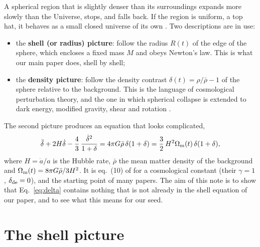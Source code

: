 \documentclass[11pt,a4paper]{article}
\begin{document}
A spherical region that is slightly denser than its surroundings expands
more slowly than the Universe, stops, and falls back. If the region is
uniform, a top hat, it behaves as a small closed universe of its own
\citep{Gunn1972,Peebles1980}. Two descriptions are in use:
\begin{itemize}
\item the \textbf{shell (or radius) picture}: follow the radius $R(t)$ of
the edge of the sphere, which encloses a fixed mass $M$ and obeys
Newton's law. This is what our main paper does, shell by shell;
\item the \textbf{density picture}: follow the density contrast
$\delta(t)=\rho/\bar\rho-1$ of the sphere relative to the background. This
is the language of cosmological perturbation theory, and the one in
which spherical collapse is extended to dark energy, modified gravity,
shear and rotation
\citep[e.g.][]{Fosalba1998,DelPopolo2013,Herrera2019}.
\end{itemize}
The second picture produces an equation that looks complicated,
\begin{equation}
  \ddot\delta+2H\dot\delta-\frac43\,\frac{\dot\delta^{2}}{1+\delta}
  =4\pi G\bar\rho\,\delta(1+\delta)
  =\frac32\,H^{2}\Omega_{\rm m}(t)\,\delta(1+\delta),
  \label{eq:delta}
\end{equation}
where $H=\dot a/a$ is the Hubble rate, $\bar\rho$ the mean matter density
of the background and $\Omega_{\rm m}(t)=8\pi G\bar\rho/3H^{2}$. It is
eq.~(10) of \citet{Herrera2019} for a cosmological constant (their
$\gamma=1$, $\delta_{\rm de}=0$), and the starting point of many papers.
The aim of this note is to show that Eq.~\eqref{eq:delta} contains
nothing that is not already in the shell equation of our paper, and to
see what this means for our seed.

\section{The shell picture}
\end{document}
